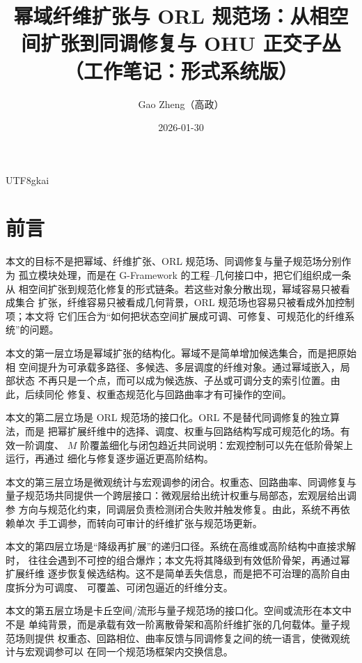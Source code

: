 \documentclass[12pt]{article}
\newcommand{\GFramework}{\textsf{G-Framework}}
\begin{document}
\begin{CJK*}{UTF8}{gkai}

\title{幂域纤维扩张与 ORL 规范场：从相空间扩张到同调修复与 OHU 正交子丛\\（工作笔记：形式系统版）}
\author{Gao Zheng（高政）}
\date{2026-01-30}
\maketitle

\section*{前言}

本文的目标不是把幂域、纤维扩张、ORL 规范场、同调修复与量子规范场分别作为
孤立模块处理，而是在 \GFramework{} 的工程--几何接口中，把它们组织成一条从
相空间扩张到规范化修复的形式链条。若这些对象分散出现，幂域容易只被看成集合
扩张，纤维容易只被看成几何背景，ORL 规范场也容易只被看成外加控制项；本文将
它们压合为“如何把状态空间扩展成可调、可修复、可规范化的纤维系统”的问题。

本文的第一层立场是幂域扩张的结构化。幂域不是简单增加候选集合，而是把原始相
空间提升为可承载多路径、多候选、多层调度的纤维对象。通过幂域嵌入，局部状态
不再只是一个点，而可以成为候选族、子丛或可调分支的索引位置。由此，后续同伦
修复、权重态规范化与回路曲率才有可操作的空间。

本文的第二层立场是 ORL 规范场的接口化。ORL 不是替代同调修复的独立算法，而是
把幂扩展纤维中的选择、调度、权重与回路结构写成可规范化的场。有效一阶调度、
\(M\) 阶覆盖细化与闭包趋近共同说明：宏观控制可以先在低阶骨架上运行，再通过
细化与修复逐步逼近更高阶结构。

本文的第三层立场是微观统计与宏观调参的闭合。权重态、回路曲率、同调修复与
量子规范场共同提供一个跨层接口：微观层给出统计权重与局部态，宏观层给出调参
方向与规范化约束，同调层负责检测闭合失败并触发修复。由此，系统不再依赖单次
手工调参，而转向可审计的纤维扩张与规范场更新。

本文的第四层立场是“降级再扩展”的递归口径。系统在高维或高阶结构中直接求解时，
往往会遇到不可控的组合爆炸；本文先将其降级到有效低阶骨架，再通过幂扩展纤维
逐步恢复候选结构。这不是简单丢失信息，而是把不可治理的高阶自由度拆分为可调度、
可覆盖、可闭包逼近的纤维分支。

本文的第五层立场是卡丘空间/流形与量子规范场的接口化。空间或流形在本文中不是
单纯背景，而是承载有效一阶离散骨架和高阶纤维扩张的几何载体。量子规范场则提供
权重态、回路相位、曲率反馈与同调修复之间的统一语言，使微观统计与宏观调参可以
在同一个规范场框架内交换信息。


\end{CJK*}
\end{document}
